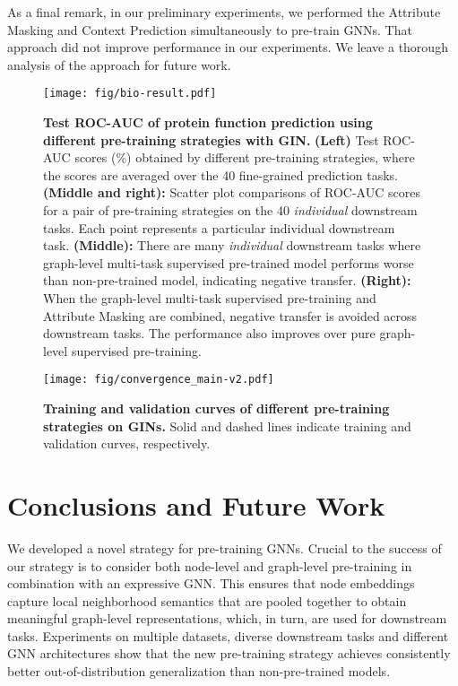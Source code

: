 \documentclass{article} \usepackage{iclr2020_conference,times}
\numberwithin{equation}{section}
\theoremstyle{plain}
\theoremstyle{definition}
\theoremstyle{remark}
\begin{document}
As a final remark, in our preliminary experiments, we performed the Attribute Masking and Context Prediction simultaneously to pre-train GNNs. That approach did not improve performance in our experiments. We leave a thorough analysis of the approach for future work. 

\begin{figure}[t]
\centering
\texttt{[image: fig/bio-result.pdf]}
\caption{{\bf Test ROC-AUC of protein function prediction using different pre-training strategies with GIN.} {\bf (Left)} Test ROC-AUC scores (\%) obtained by different pre-training strategies, where the scores are averaged over the 40 fine-grained prediction tasks. {\bf (Middle and right):} Scatter plot comparisons of ROC-AUC scores for a pair of pre-training strategies on the 40 \emph{individual} downstream tasks. Each point represents a particular individual downstream task. {{\bf (Middle):}} There are many \emph{individual} downstream tasks where graph-level multi-task supervised pre-trained model performs worse than non-pre-trained model, indicating negative transfer.
{\bf (Right):} When the graph-level multi-task supervised pre-training and Attribute Masking are combined, negative transfer is avoided across downstream tasks. The performance also improves over pure graph-level supervised pre-training.
}
\label{fig:bio-pair-comp}
\vspace{-0.2cm}
\end{figure}


\begin{figure}[t]
\texttt{[image: fig/convergence\_main-v2.pdf]}
\caption{{\bf Training and validation curves of different pre-training strategies on GINs.} Solid and dashed lines indicate training and validation curves, respectively.}
\label{fig:main-curve}
\vspace{-0.2cm}
\end{figure}


 \section{Conclusions and Future Work}
\vspace{-0.1cm}
We developed a novel strategy for pre-training GNNs. Crucial to the success of our strategy is to consider both node-level and graph-level pre-training in combination with an expressive GNN. This ensures that node embeddings capture local neighborhood semantics that are pooled together to obtain meaningful graph-level representations, which, in turn, are used for downstream tasks. Experiments on multiple datasets, diverse downstream tasks and different GNN architectures show that the new pre-training strategy achieves consistently better out-of-distribution generalization than non-pre-trained models.
\end{document}
